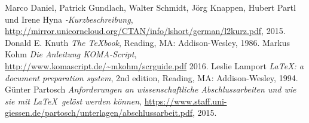 \documentclass[11pt]{scrartcl}       %
\begin{document}
\begin{thebibliography}{99}                    %


	Marco Daniel, Patrick Gundlach, Walter Schmidt, Jörg Knappen, Hubert
	Partl und Irene Hyna
	\emph{\LaTeXe-Kurzbeschreibung},
	\url{http://mirror.unicorncloud.org/CTAN/info/lshort/german/l2kurz.pdf},
	2015.
	Donald E. Knuth
	\emph{The \TeX book},
  Reading, MA: Addison-Wesley,
	1986.
	Markus Kohm
	\emph{Die Anleitung \textsf{KOMA-Script}},
	\url{http://www.komascript.de/~mkohm/scrguide.pdf}
	2016.
  Leslie Lamport
  \emph{\LaTeX: a document preparation system},
  2nd edition,
  Reading, MA: Addison-Wesley,
  1994.
	Günter Partosch
	\emph{Anforderungen an wissenschaftliche Abschlussarbeiten und wie sie
	mit \LaTeX\ gelöst werden können},
	\url{https://www.staff.uni-giessen.de/partosch/unterlagen/abschlussarbeit.pdf},
	2015.

\end{thebibliography}
\end{document}
